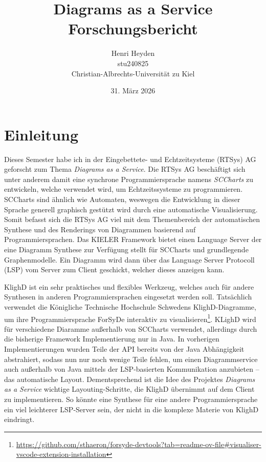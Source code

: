 

\usepackage{titling}
\setlength{\droptitle}{-10em}


\title{Diagrams as a Service \\ \small Forschungsbericht}
\date{31. März 2026}
\author{Henri Heyden \\%
 \small stu240825 \\%
 \small Christian-Albrechts-Universität zu Kiel%
}


    \maketitle
    
    \section{Einleitung}
    Dieses Semester habe ich in der Eingebettete- und Echtzeitsysteme (RTSys) AG geforscht zum Thema \emph{Diagrams as a Service}.
    Die RTSys AG beschäftigt sich unter anderem damit eine synchrone Programmiersprache namens \emph{SCCharts} zu entwickeln, welche verwendet wird, um Echtzeitssysteme zu programmieren.
    SCCharts sind ähnlich wie Automaten, weswegen die Entwicklung in dieser Sprache generell graphisch gestützt wird durch eine automatische Visualisierung.
    Somit befasst sich die RTSys AG viel mit dem Themenbereich der automatischen Synthese und des Renderings von Diagrammen basierend auf Programmiersprachen.
    Das KIELER Framework bietet einen Language Server der eine Diagramm Synthese zur Verfügung stellt für SCCharts und grundlegende Graphenmodelle.
    Ein Diagramm wird dann über das Language Server Protocoll (LSP) vom Server zum Client geschickt, welcher dieses anzeigen kann.
    
    KlighD ist ein sehr praktisches und flexibles Werkzeug, welches auch für andere Synthesen in anderen Programmiersprachen eingesetzt werden soll.
    Tatsächlich verwendet die Königliche Technische Hochschule Schwedens KlighD-Diagramme, um ihre Programmiersprache ForSyDe interaktiv zu visualisieren\footnote{\url{https://github.com/sthaeron/forsyde-devtools?tab=readme-ov-file\#visualiser-vscode-extension-installation}}.
    KLighD wird für verschiedene Diaramme außerhalb von SCCharts verwendet, allerdings durch die bisherige Framework Implementierung nur in Java.
    In vorherigen Implementierungen wurden Teile der API bereits von der Java Abhängigkeit abstrahiert, sodass nun nur noch wenige Teile fehlen, um einen Diagrammservice auch außerhalb von Java mittels der LSP-basierten Kommunikation anzubieten -- das automatische Layout.
    Dementsprechend ist die Idee des Projektes \emph{Diagrams as a Service} wichtige Layouting-Schritte, die KlighD übernimmt auf dem Client zu implementieren.
    So könnte eine Synthese für eine andere Programmiersprache ein viel leichterer LSP-Server sein, der nicht in die komplexe Materie von KlighD eindringt.

